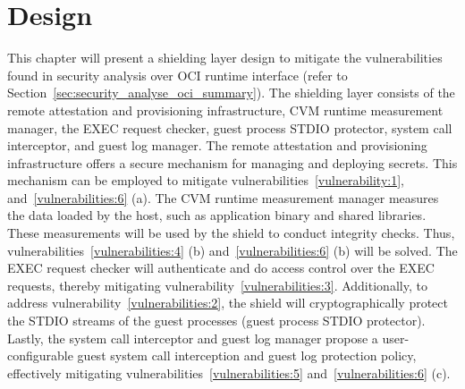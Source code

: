 \chapter{Design}
\label{sec:design}




This chapter will present a shielding layer design to mitigate the vulnerabilities found in security analysis over OCI runtime interface (refer to Section~\ref{sec:security_analyse_oci_summary}). The shielding layer consists of the remote attestation and provisioning infrastructure, CVM runtime measurement manager, the EXEC request checker, 
guest process STDIO protector, system call interceptor, and guest log manager. The remote attestation and provisioning infrastructure offers a secure mechanism for managing and deploying secrets. This mechanism can be employed to mitigate vulnerabilities~\ref{vulnerability:1}, and~\ref{vulnerabilities:6} (a). The CVM runtime measurement manager measures the data 
loaded by the host, such as application binary and shared libraries. These measurements will be used by the shield to conduct integrity checks. Thus, vulnerabilities~\ref{vulnerabilities:4} (b) and~\ref{vulnerabilities:6} (b)  will be solved. The EXEC request checker will authenticate and do access control over the EXEC 
requests, thereby mitigating vulnerability~\ref{vulnerabilities:3}. Additionally, to address vulnerability~\ref{vulnerabilities:2}, the shield will cryptographically protect the STDIO streams of the guest processes (guest process STDIO protector). Lastly, the system call interceptor and guest log manager propose 
a user-configurable guest system call interception and guest log protection policy,  effectively mitigating vulnerabilities~\ref{vulnerabilities:5} and~\ref{vulnerabilities:6} (c).

